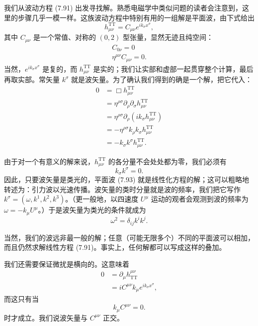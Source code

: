 我们从波动方程 (7.91) 出发寻找解。熟悉电磁学中类似问题的读者会注意到，这里的步骤几乎一模一样。这族波动方程中特别有用的一组解是平面波，由下式给出
\begin{equation*}
h^{\mathrm{TT}}_{\mu\nu} = C_{\mu\nu}e^{ik_\sigma x^\sigma},
\tag{7.93}
\end{equation*}
其中 $C_{\mu\nu}$ 是一个常值、对称的 $(0,2)$ 型张量，显然无迹且纯空间：
\begin{gather*}
C_{0\nu} = 0 \\
\eta^{\mu\nu}C_{\mu\nu} = 0.
\tag{7.94}
\end{gather*}
当然，$e^{ik_\sigma x^\sigma}$ 是复的，而 $h^{\mathrm{TT}}_{\mu\nu}$ 是实的；我们让实部和虚部一起贯穿整个计算，最后再取实部。常矢量 $k^\sigma$ 就是波矢量。为了确认我们得到的确是一个解，把它代入：
\begin{align*}
0 &= \Box h^{\mathrm{TT}}_{\mu\nu} \\
&= \eta^{\rho\sigma}\partial_\rho\partial_\sigma h^{\mathrm{TT}}_{\mu\nu} \\
&= \eta^{\rho\sigma}\partial_\rho(ik_\sigma h^{\mathrm{TT}}_{\mu\nu}) \\
&= -\eta^{\rho\sigma}k_\rho k_\sigma h^{\mathrm{TT}}_{\mu\nu} \\
&= -k_\sigma k^\sigma h^{\mathrm{TT}}_{\mu\nu}.
\tag{7.95}
\end{align*}


由于对一个有意义的解来说，$h^{\mathrm{TT}}_{\mu\nu}$ 的各分量不会处处都为零，我们必须有
\begin{equation*}
k_\sigma k^\sigma = 0.
\tag{7.96}
\end{equation*}
因此，只要波矢量是类光的，平面波 (7.93) 就是线性化方程的解；这可以粗略地转述为：引力波以光速传播。波矢量的类时分量就是波的频率，我们把它写作 $k^\sigma = (\omega, k^1, k^2, k^3)$。（更一般地，以四速度 $U^\mu$ 运动的观者会观测到波的频率为 $\omega = -k_\mu U^\mu$。）于是波矢量为类光的条件就成为
\begin{equation*}
\omega^2 = \delta_{ij}k^ik^j.
\tag{7.97}
\end{equation*}

当然，我们的波远非最一般的解；任意（可能无限多个）不同的平面波可以相加，而且仍然求解线性方程 (7.91)。事实上，任何解都可以写成这样的叠加。

我们还需要保证微扰是横向的。这意味着
\begin{align*}
0 &= \partial_\mu h^{\mu\nu}_{\mathrm{TT}} \\
&= iC^{\mu\nu}k_\mu e^{ik_\sigma x^\sigma},
\tag{7.98}
\end{align*}
而这只有当
\begin{equation*}
k_\mu C^{\mu\nu} = 0.
\tag{7.99}
\end{equation*}
时才成立。我们说波矢量与 $C^{\mu\nu}$ 正交。

